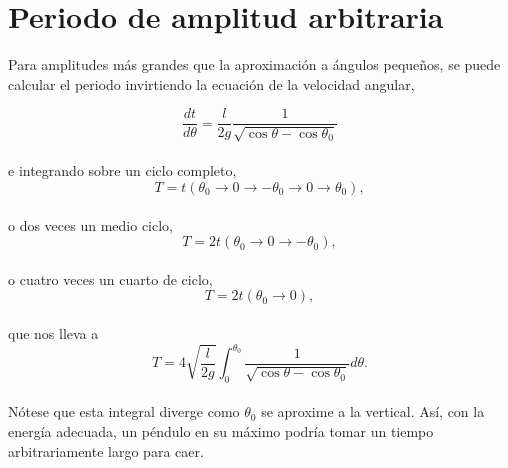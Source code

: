 \documentclass[11pt,spanish]{article}
\begin{document}
\section*{Periodo de amplitud arbitraria}

Para amplitudes más grandes que la aproximación a ángulos pequeños, se puede calcular el periodo invirtiendo la ecuación de la velocidad angular,

\begin{equation}
\frac{dt}{d\theta}=\frac{l}{2g} \frac{1}{\sqrt{\cos \theta - \cos \theta_0}}
\end{equation}\\
e integrando sobre un ciclo completo,
$$ T= t(\theta _0 \rightarrow 0 \rightarrow -\theta_0 \rightarrow 0 \rightarrow \theta_0),$$\\
o dos veces un medio ciclo,
$$ T= 2t(\theta _0 \rightarrow 0 \rightarrow -\theta_0),$$\\
o cuatro veces un cuarto de ciclo,
$$ T= 2t(\theta _0 \rightarrow 0),$$\\
que nos lleva a
\begin{equation}
T= 4 \sqrt{\frac{l}{2g}} \int ^{\theta _0} _0 \frac{1}{\sqrt{\cos\theta - \cos\theta_0}} d\theta.
\end{equation}\\
Nótese que esta integral diverge como $\theta_0$ se aproxime a la vertical. Así, con la energía adecuada, un péndulo en su máximo podría tomar un tiempo arbitrariamente largo para caer.
\end{document}
